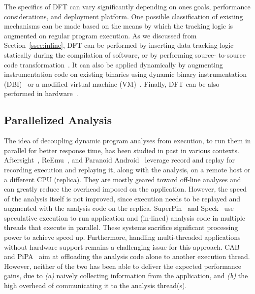 The specifics of DFT can vary significantly depending on ones goals,
performance considerations, and deployment platform. One possible
classification of existing mechanisms can be made based on the means by which
the tracking logic is augmented on regular program execution. As we discussed
from Section~\ref{ssec:inline}, DFT can be performed by inserting data tracking
logic statically during the compilation of software, or by performing source-
to-source code transformation~\cite{txl, cil}. It can also be applied
dynamically by augmenting instrumentation code on existing binaries using
dynamic binary instrumentation (DBI)~\cite{pin:pldi2005, valgrind, dynamorio}
or a modified virtual machine (VM)~\cite{qemu:usenix05, xen:sosp2003}.
Finally, DFT can be also performed in hardware~\cite{raksha:isca2007,
lba:isca2008}.

\subsection{Parallelized Analysis}
\label{ssec:parallel}

The idea of decoupling dynamic program analyses from execution, to run them in
parallel for better response time, has been studied in past in various
contexts. 
%
Aftersight~\cite{aftersight:atc2008}, ReEmu~\cite{reemu:ppopp2013}, and
Paranoid Android~\cite{paranoidandroid:acsac10} leverage record and replay for
recording execution and replaying it, along with the analysis, on a remote host
or a different CPU (replica). They are mostly geared toward off-line analyses
and can greatly reduce the overhead imposed on the application.  However, the
speed of the analysis itself is not improved, since execution needs to be
replayed and augmented with the analysis code on the replica.
SuperPin~\cite{superpin:cgo2007} and Speck~\cite{speck:asplos2008} use
speculative execution to run application and (in-lined) analysis code in
multiple threads that execute in parallel.  These systems sacrifice significant
processing power to achieve speed up.  Furthermore, handling multi-threaded
applications without hardware support remains a challenging issue for this
approach. CAB~\cite{cab:oopsala2009} and PiPA~\cite{pipa:cgo2008} aim at
offloading the analysis code alone to another execution thread. However, neither of the two has been able to deliver
the expected performance gains, due to {\it (a)} naively collecting information
from the application, and {\it (b)} the high overhead of communicating it to
the analysis thread(s). 


